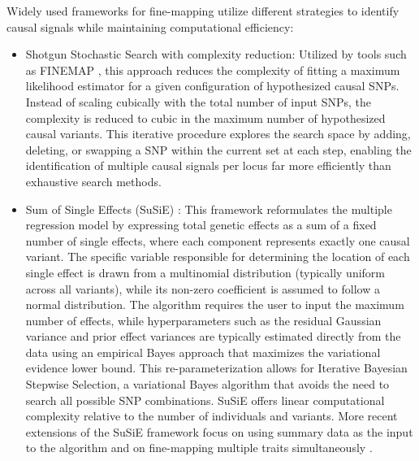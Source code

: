 Widely used frameworks for fine-mapping utilize different strategies to identify causal signals while maintaining computational efficiency:
\begin{itemize}
    \item Shotgun Stochastic Search with complexity reduction: Utilized by tools such as FINEMAP \cite{10.1093/bioinformatics/btw018}, this approach reduces the complexity of fitting a maximum likelihood estimator for a given configuration of hypothesized causal SNPs. Instead of scaling cubically with the total number of input SNPs, the complexity is reduced to cubic in the maximum number of hypothesized causal variants. This iterative procedure explores the search space by adding, deleting, or swapping a SNP within the current set at each step, enabling the identification of multiple causal signals per locus far more efficiently than exhaustive search methods.
    \item Sum of Single Effects (SuSiE) \cite{susie_original}: This framework reformulates the multiple regression model by expressing total genetic effects as a sum of a fixed number of single effects, where each component represents exactly one causal variant. The specific variable responsible for determining the location of each single effect is drawn from a multinomial distribution (typically uniform across all variants), while its non-zero coefficient is assumed to follow a normal distribution. The algorithm requires the user to input the maximum number of effects, while hyperparameters such as the residual Gaussian variance and prior effect variances are typically estimated directly from the data using an empirical Bayes approach that maximizes the variational evidence lower bound. This re-parameterization allows for Iterative Bayesian Stepwise Selection, a variational Bayes algorithm that avoids the need to search all possible SNP combinations. SuSiE offers linear computational complexity relative to the number of individuals and variants. More recent extensions of the SuSiE framework focus on using summary data \cite{susie} as the input to the algorithm and on fine-mapping multiple traits simultaneously \cite{SusieMultiTrait2026}.
\end{itemize}

